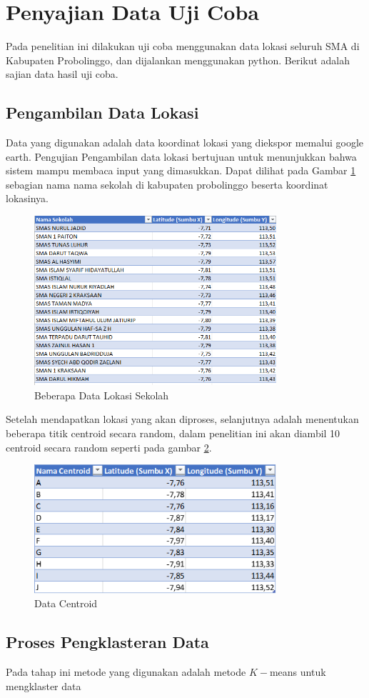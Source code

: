 \section{Penyajian Data Uji Coba}

Pada penelitian ini dilakukan uji coba menggunakan data lokasi seluruh SMA di Kabupaten Probolinggo, dan dijalankan menggunakan python. Berikut adalah sajian data hasil uji coba.

\subsection{Pengambilan Data Lokasi}

Data yang digunakan adalah data koordinat lokasi yang diekspor memalui google earth. Pengujian Pengambilan data lokasi bertujuan untuk menunjukkan bahwa sistem 
mampu membaca input yang dimasukkan. Dapat dilihat pada Gambar \ref{fig:datalok} sebagian nama nama sekolah di kabupaten probolinggo beserta koordinat lokasinya.

\begin{figure}[h!]
  \centering
  \includegraphics[width=0.8\textwidth]{data lokasi sekolah.png}
  \caption{Beberapa Data Lokasi Sekolah}
  \label{fig:datalok}
\end{figure}

Setelah mendapatkan lokasi yang akan diproses, selanjutnya adalah menentukan beberapa titik centroid secara random, dalam penelitian ini akan diambil 10 centroid secara random seperti pada gambar \ref{fig:dasen}.

\begin{figure}[h!]
	\centering
	\includegraphics[width=0.8\textwidth]{centroid.png}
	\caption{Data Centroid}
	\label{fig:dasen}
\end{figure}

\subsection{Proses Pengklasteran Data}

Pada tahap ini metode yang digunakan adalah metode $K-$means untuk mengklaster data